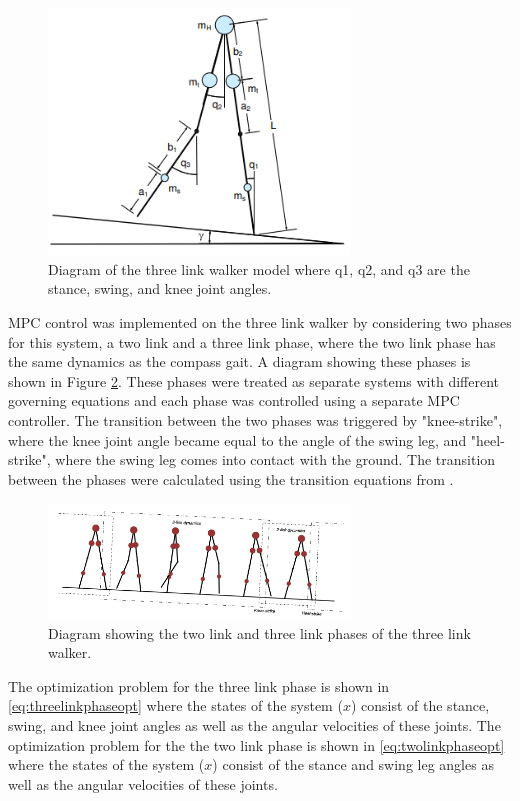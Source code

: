 \documentclass{./springer/svjour3}
\begin{document}
\begin{figure}[!h]
  \centering
  \includegraphics[width=8cm]{./figures/threeleg.png}
  \caption{Diagram of the three link walker model where q1, q2, and q3 are the stance, swing, and knee joint angles.}
  \label{fig:threeleg}
\end{figure}

MPC control was implemented on the three link walker by considering two phases for this system, a two link and a 
three link phase, where the two link phase has the same dynamics as the compass gait. A diagram showing these phases is shown in 
Figure \ref{fig:threelegstates}. These phases were treated as separate systems with different governing equations and 
each phase was controlled using a separate MPC controller. The transition between the two phases was triggered by "knee-strike", where the 
knee joint angle became equal to the angle of the swing leg, and "heel-strike", where the swing leg comes into contact with the ground. The 
transition between the phases were calculated using the transition equations from \cite{Chen2007PassiveDW}.
\begin{figure}[!h]
  \centering
  \includegraphics[width=8cm]{./figures/threelegstates.png}
  \caption{Diagram showing the two link and three link phases of the three link walker.}
  \label{fig:threelegstates}
\end{figure}

The optimization problem for the three link phase is shown in \ref{eq:threelinkphaseopt} where the states of the system ($x$) consist of 
the stance, swing, and knee joint angles as well as the angular velocities of these joints. The optimization problem for the the two link phase is 
shown in \ref{eq:twolinkphaseopt} where the states of the system ($x$) consist of the stance and swing leg angles as well as the angular velocities of these joints.
\end{document}
